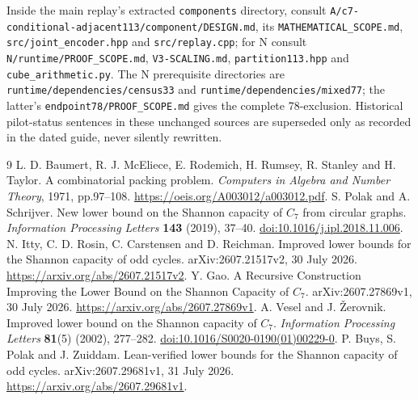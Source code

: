 \documentclass[11pt]{article}
\theoremstyle{definition}
\begin{document}
Inside the main replay's extracted \nolinkurl{components} directory, consult
\nolinkurl{A/c7-conditional-adjacent113/component/DESIGN.md}, its
\nolinkurl{MATHEMATICAL_SCOPE.md}, \nolinkurl{src/joint_encoder.hpp} and
\nolinkurl{src/replay.cpp}; for N consult \nolinkurl{N/runtime/PROOF_SCOPE.md},
\nolinkurl{V3-SCALING.md}, \nolinkurl{partition113.hpp} and
\nolinkurl{cube_arithmetic.py}. The N prerequisite directories are
\nolinkurl{runtime/dependencies/census33} and
\nolinkurl{runtime/dependencies/mixed77}; the latter's
\nolinkurl{endpoint78/PROOF_SCOPE.md} gives the complete 78-exclusion.
Historical pilot-status sentences in these unchanged sources are superseded
only as recorded in the dated guide, never silently rewritten.

\clearpage
\begin{thebibliography}{9}
 L. D. Baumert, R. J. McEliece, E. Rodemich, H. Rumsey,
R. Stanley and H. Taylor. A combinatorial packing problem.
\emph{Computers in Algebra and Number Theory}, 1971, pp.97--108.
\url{https://oeis.org/A003012/a003012.pdf}.
 S. Polak and A. Schrijver.
New lower bound on the Shannon capacity of $C_7$ from circular graphs.
\emph{Information Processing Letters} \textbf{143} (2019), 37--40.
\href{https://doi.org/10.1016/j.ipl.2018.11.006}{doi:10.1016/j.ipl.2018.11.006}.
 N. Itty, C. D. Rosin, C. Carstensen and D. Reichman.
Improved lower bounds for the Shannon capacity of odd cycles.
arXiv:2607.21517v2, 30 July 2026.
\url{https://arxiv.org/abs/2607.21517v2}.
 Y. Gao.
A Recursive Construction Improving the Lower Bound on the Shannon
Capacity of $C_7$. arXiv:2607.27869v1, 30 July 2026.
\url{https://arxiv.org/abs/2607.27869v1}.
 A. Vesel and J. \v{Z}erovnik.
Improved lower bound on the Shannon capacity of $C_7$.
\emph{Information Processing Letters} \textbf{81}(5) (2002), 277--282.
\href{https://doi.org/10.1016/S0020-0190(01)00229-0}{doi:10.1016/S0020-0190(01)00229-0}.
 P. Buys, S. Polak and J. Zuiddam.
Lean-verified lower bounds for the Shannon capacity of odd cycles.
arXiv:2607.29681v1, 31 July 2026.
\url{https://arxiv.org/abs/2607.29681v1}.
\end{thebibliography}
\end{document}
